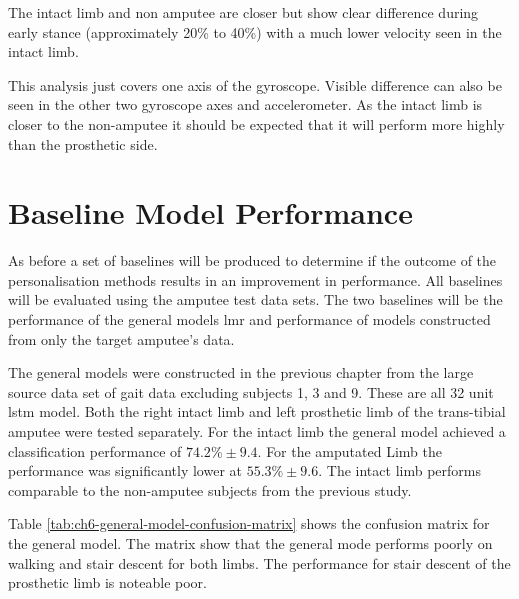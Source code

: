 The intact limb and non amputee are closer but show clear difference during early stance (approximately 20\% to 40\%) with a much lower velocity seen in the intact limb.

This analysis just covers one axis of the gyroscope. Visible difference can also be seen in the other two gyroscope axes and accelerometer. As the intact limb is closer to the non-amputee it should be expected that it will perform more highly than the prosthetic side.

\section{Baseline Model Performance}
\label{sec:amputee-baseline}
As before a set of baselines will be produced to determine if the outcome of the personalisation methods results in an improvement in performance. All baselines will be evaluated using the amputee test data sets. The two baselines will be the performance of the general models \acrshort{lmr} and performance of models constructed from only the target amputee's data.

The general models were constructed in the previous chapter from the large source data set of gait data excluding subjects 1, 3 and 9. These are all 32 unit \acrshort{lstm} model. Both the right intact limb and left prosthetic limb of the trans-tibial amputee were tested separately. For the intact limb the general model achieved a classification performance of $74.2\%\pm9.4$. For the amputated Limb the performance was significantly lower at $55.3\%\pm9.6$. The intact limb performs comparable to the non-amputee subjects from the previous study.

Table \ref{tab:ch6-general-model-confusion-matrix} shows the confusion matrix for the general model. The matrix show that the general mode performs poorly on walking and stair descent for both limbs. The performance for stair descent of the prosthetic limb is noteable poor.

